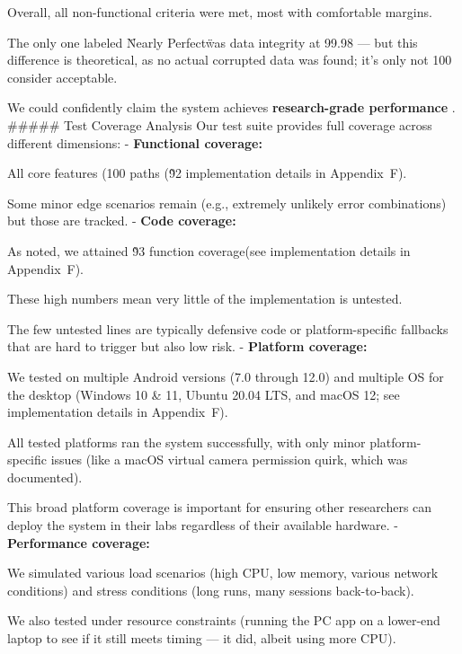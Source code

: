 {{{{{{{Overall, all non-functional criteria were met, most with comfortable margins.

The only one labeled \"Nearly Perfect\" was data integrity at 99.98%
--- but this difference is theoretical, as no actual corrupted data was found; it's
only not 100%
consider acceptable.

We could confidently claim the system achieves \textbf{research-grade performance}
.  ##### Test Coverage Analysis Our test suite provides full coverage across
different dimensions: - \textbf{Functional coverage:}

All core features (100%
paths (\~92%
implementation details in Appendix~F).

Some minor edge scenarios remain (e.g., extremely unlikely error combinations) but
those are tracked.  - \textbf{Code coverage:}

As noted, we attained \~93%
function coverage(see implementation details in Appendix~F).

These high numbers mean very little of the implementation is untested.

The few untested lines are typically defensive code or platform-specific fallbacks
that are hard to trigger but also low risk.  - \textbf{Platform coverage:}

We tested on multiple Android versions (7.0 through 12.0) and multiple OS for the
desktop (Windows 10 \& 11, Ubuntu 20.04 LTS, and macOS 12; see implementation details
in Appendix~F).

All tested platforms ran the system successfully, with only minor platform-specific
issues (like a macOS virtual camera permission quirk, which was documented).

This broad platform coverage is important for ensuring other researchers can deploy
the system in their labs regardless of their available hardware.  -
\textbf{Performance coverage:}

We simulated various load scenarios (high CPU, low memory, various network
conditions) and stress conditions (long runs, many sessions back-to-back).

We also tested under resource constraints (running the PC app on a lower-end laptop
to see if it still meets timing --- it did, albeit using more CPU).

}}}}}}}
